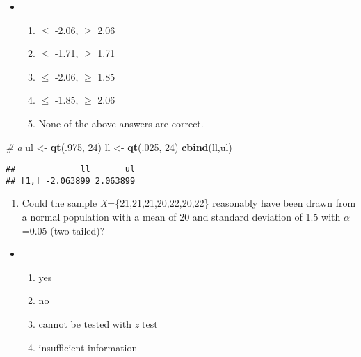 \documentclass[]{article}
\newenvironment{Shaded}{\begin{snugshade}}{\end{snugshade}}
\newcommand{\KeywordTok}[1]{\textcolor[rgb]{0.13,0.29,0.53}{\textbf{#1}}}
\newcommand{\DecValTok}[1]{\textcolor[rgb]{0.00,0.00,0.81}{#1}}
\newcommand{\StringTok}[1]{\textcolor[rgb]{0.31,0.60,0.02}{#1}}
\newcommand{\CommentTok}[1]{\textcolor[rgb]{0.56,0.35,0.01}{\textit{#1}}}
\newcommand{\NormalTok}[1]{#1}
\providecommand{\tightlist}{%
  \setlength{\itemsep}{0pt}\setlength{\parskip}{0pt}}
\begin{document}
\begin{itemize}
\item
  \begin{enumerate}
  \def\labelenumi{\alph{enumi}.}
  \item
    \(\leq\) -2.06, \(\geq\) 2.06
  \item
    \(\leq\) -1.71, \(\geq\) 1.71
  \item
    \(\leq\) -2.06, \(\geq\) 1.85
  \item
    \(\leq\) -1.85, \(\geq\) 2.06
  \item
    None of the above answers are correct.
  \end{enumerate}
\end{itemize}

\begin{Shaded}
\begin{Highlighting}[]
\CommentTok{# a}
\NormalTok{ul <-}\StringTok{ }\KeywordTok{qt}\NormalTok{(.}\DecValTok{975}\NormalTok{, }\DecValTok{24}\NormalTok{)}
\NormalTok{ll <-}\StringTok{ }\KeywordTok{qt}\NormalTok{(.}\DecValTok{025}\NormalTok{, }\DecValTok{24}\NormalTok{)}
\KeywordTok{cbind}\NormalTok{(ll,ul)}
\end{Highlighting}
\end{Shaded}

\begin{verbatim}
##             ll       ul
## [1,] -2.063899 2.063899
\end{verbatim}

\begin{enumerate}
\def\labelenumi{\arabic{enumi}.}
\setcounter{enumi}{21}
\tightlist
\item
  Could the sample \emph{X}=\{21,21,21,20,22,20,22\} reasonably have
  been drawn from a normal population with a mean of 20 and standard
  deviation of 1.5 with \(\alpha\)=0.05 (two-tailed)?
\end{enumerate}

\begin{itemize}
\item
  \begin{enumerate}
  \def\labelenumi{\alph{enumi}.}
  \item
    yes
  \item
    no
  \item
    cannot be tested with \emph{z} test
  \item
    insufficient information
  \end{enumerate}
\end{itemize}
\end{document}
